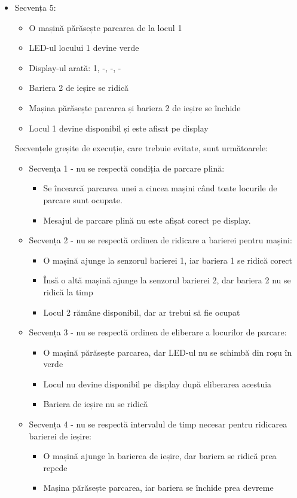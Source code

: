 \documentclass[a4paper,11pt]{report}
\begin{document}
\begin{itemize}
\item Secvența 5: \begin{itemize} \item O mașină părăsește parcarea de la locul 1 \item LED-ul locului 1 devine verde \item Display-ul arată: 1, -, -, - \item Bariera 2 de ieșire se ridică \item Mașina părăsește parcarea și bariera 2 de ieșire se închide \item Locul 1 devine disponibil și este afisat pe display \end{itemize}


\noindent Secvențele greșite de execuție, care trebuie evitate, sunt următoarele:

\begin{itemize} \item Secvența 1 - nu se respectă condiția de parcare plină: \begin{itemize} \item Se încearcă parcarea unei a cincea mașini când toate locurile de parcare sunt ocupate. \item Mesajul de parcare plină nu este afișat corect pe display. \end{itemize}

\item Secvența 2 - nu se respectă ordinea de ridicare a barierei pentru mașini: \begin{itemize} \item O mașină ajunge la senzorul barierei 1, iar bariera 1 se ridică corect \item Însă o altă mașină ajunge la senzorul barierei 2, dar bariera 2 nu se ridică la timp \item Locul 2 rămâne disponibil, dar ar trebui să fie ocupat \end{itemize}

\item Secvența 3 - nu se respectă ordinea de eliberare a locurilor de parcare: \begin{itemize} \item O mașină părăsește parcarea, dar LED-ul nu se schimbă din roșu în verde \item Locul nu devine disponibil pe display după eliberarea acestuia \item Bariera de ieșire nu se ridică \end{itemize}

\item Secvența 4 - nu se respectă intervalul de timp necesar pentru ridicarea barierei de ieșire: \begin{itemize} \item O mașină ajunge la barierea de ieșire, dar bariera se ridică prea repede \item Mașina părăsește parcarea, iar bariera se închide prea devreme \end{itemize}


\end{itemize}
\end{itemize}
\end{document}
